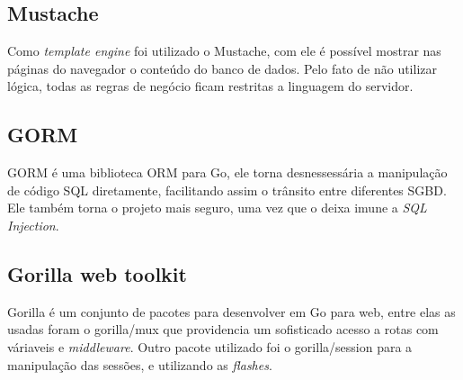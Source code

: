 \subsection{Mustache}

Como \textit{template engine} foi utilizado o Mustache, com ele é possível mostrar nas páginas do navegador o conteúdo do banco de dados. Pelo fato de não utilizar lógica, todas as regras de negócio ficam restritas a linguagem do servidor.

\subsection{GORM}

GORM é uma biblioteca ORM para Go, ele torna desnessessária a manipulação de código SQL diretamente, facilitando assim o trânsito entre diferentes SGBD. Ele também torna o projeto mais seguro, uma vez que o deixa imune a \textit{SQL Injection}.

\subsection{Gorilla web toolkit}

Gorilla é um conjunto de pacotes para desenvolver em Go para web, entre elas as usadas foram o gorilla/mux que providencia um sofisticado acesso a rotas com váriaveis e \textit{middleware}. Outro pacote utilizado foi o gorilla/session para a manipulação das sessões, e utilizando as \textit{flashes}.
